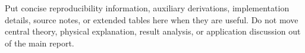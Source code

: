 \documentclass[11pt,a4paper]{article}
\newif\ifQiushiHasCitations
\begin{document}
Put concise reproducibility information, auxiliary derivations, implementation
details, source notes, or extended tables here when they are useful. Do not move
central theory, physical explanation, result analysis, or application discussion
out of the main report.


\ifQiushiHasCitations
  \IfFileExists{refs.bib}{%
    
    }{}
\fi
\end{document}
